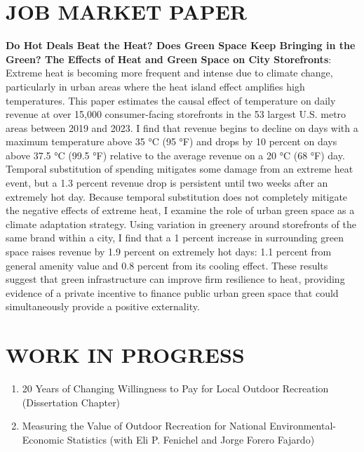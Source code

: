 \documentclass[11pt]{article}
\begin{document}
\section*{JOB MARKET PAPER}
\textbf{Do Hot Deals Beat the Heat? Does Green Space Keep Bringing in the Green? The Effects of Heat and Green Space on City Storefronts}: Extreme heat is becoming more frequent and intense due to climate change, particularly in urban areas where the heat island effect amplifies high temperatures. This paper estimates the causal effect of temperature on daily revenue at over 15,000 consumer-facing storefronts in the 53 largest U.S. metro areas between 2019 and 2023. I find that revenue begins to decline on days with a maximum temperature above 35 °C (95 °F) and drops by 10 percent on days above 37.5 °C (99.5 °F) relative to the average revenue on a 20 °C (68 °F) day. Temporal substitution of spending mitigates some damage from an extreme heat event, but a 1.3 percent revenue drop is persistent until two weeks after an extremely hot day. Because temporal substitution does not completely mitigate the negative effects of extreme heat, I examine the role of urban green space as a climate adaptation strategy. Using variation in greenery around storefronts of the same brand within a city, I find that a 1 percent increase in surrounding green space raises revenue by 1.9 percent on extremely hot days: 1.1 percent from general amenity value and 0.8 percent from its cooling effect. These results suggest that green infrastructure can improve firm resilience to heat, providing evidence of a private incentive to finance public urban green space that could simultaneously provide a positive externality. 

\section*{WORK IN PROGRESS}
\begin{enumerate}[left=0pt]
    \item 20 Years of Changing Willingness to Pay for Local Outdoor Recreation (Dissertation Chapter)
    \item Measuring the Value of Outdoor Recreation for National Environmental-Economic Statistics (with Eli P. Fenichel and Jorge Forero Fajardo)
\end{enumerate}
\end{document}
